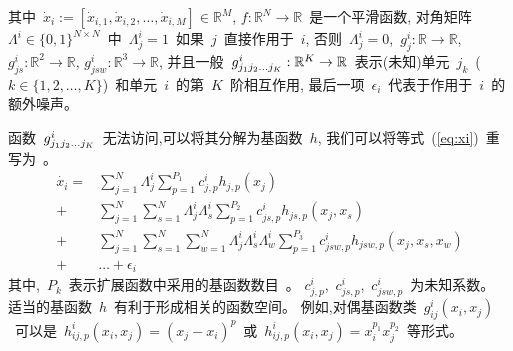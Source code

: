 其中~$\dot{x}_i :=[\dot{x}_{i,1}, \dot{x}_{i,2},\ldots,\dot{x}_{i,M}]\in \mathbb{R}^M$,
$f:\mathbb{R}^N \to \mathbb{R}$~是一个平滑函数, 
对角矩阵~$\Lambda^i \in \{0,1\}^{N \times N}$~中~$\Lambda^i_{j}=1$~如果~$j$~直接作用于~$i$, 
否则~$\Lambda^i_{j}=0$,~$g^i_j:\mathbb{R} \to \mathbb{R}$, $g^i_{js}:\mathbb{R}^2 \to \mathbb{R}$, $g^i_{jsw}:\mathbb{R}^3 \to \mathbb{R}$,
并且一般~$g^i_{j_{1}j_{2}\ldots\\j_{K}}:\mathbb{R}^K \to \mathbb{R}$~表示(未知)单元~$j_k$~($k \in \{1,2,\ldots,K\}$)~和单元~$i$~的第~$K$~阶相互作用, 
最后一项~$\epsilon_{i}$~代表于作用于~$i$~的额外噪声。

函数~$g^i_{j_{1}j_{2}\ldots\\j_{K}}$~无法访问,可以将其分解为基函数~$h$,
我们可以将等式~(\ref{eq:xi})~重写为~\cite{casadiego2017model}。
\begin{equation}
\label{eq:xi_with_h}
\begin{split}
\dot{x_i} =  &\sum_{j=1}^{N} \Lambda^i_{j} \sum_{p=1}^{P_1} c^i_{j,p}h_{j,p}(x_j) \\
+ &  \sum_{j=1}^{N} \sum_{s=1}^{N}\Lambda^i_{j}\Lambda^i_{s} \sum_{p=1}^{P_2} c^i_{js,p}h_{js,p}(x_j,x_s) \\
                             + &\sum_{j=1}^{N} \sum_{s=1}^{N} \sum_{w=1}^{N}\Lambda^i_{j}\Lambda^i_{s}\Lambda^i_{w} \sum_{p=1}^{P_3} c^i_{jsw,p}h_{jsw,p}(x_j,x_s,x_w)\\
                             + &\ldots + \epsilon_{i} 
\end{split}
\end{equation}
其中,~$P_k$~表示扩展函数中采用的基函数数目~\cite{friedman2001elements}。
$c^i_{j,p}$,~$c^i_{js,p}$,~$c^i_{jsw,p}$~为未知系数。
适当的基函数~$h$~有利于形成相关的函数空间。
例如,对偶基函数类~$g^i_{ij}(x_i,x_j)$~可以是~$h^i_{ij,p}(x_i,x_j)=(x_j-x_i)^p$~或~$h^i_{ij,p}(x_i,x_j)=x^{p_{1}}_i x^{p_{2}}_j$~等形式。


